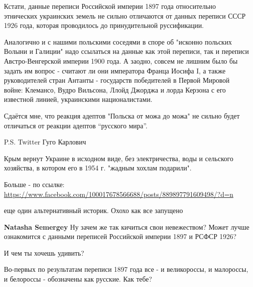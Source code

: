 \begin{itemize}
Кстати, данные переписи Российской империи 1897 года относительно этнических
украинских земель не сильно отличаются от данных переписи СССР 1926 года,
которая проводилось до принудительной руссификации.

Аналогично и с нашими польскими соседями в споре об "исконно польских Волыни и
Галиции" надо ссылаться на данные как этой переписи, так и переписи
Австро-Венгерской империи 1900 года. А заодно, совсем не лишним было бы задать
им вопрос - считают ли они императора Франца Иосифа I, а также руководителей
стран Антанты - государств победителей в Первой Мировой войне: Клемансо, Вудро
Вильсона, Ллойд Джорджа и лорда Керзона с его известной линией, украинскими
националистами.

Сдаётся мне, что реакция адептов "Польска от можа до можа" не сильно будет
отличаться от реакции адептов “русского мира”.

P.S. Twitter Гуго Карлович

Крым вернут Украине в исходном виде, без электричества, воды и сельского
хозяйства, в котором его в 1954 г. "жадным хохлам подарили".

Больше - по ссылке: \url{https://www.facebook.com/100017678566688/posts/889897791609498/?d=n}

\begin{itemize}
 
еще один альтернативный историк. Охохо как все запущено

 
\textbf{Natasha Semergey} Ну зачем же так кичиться свои невежеством? Может лучше ознакомится с данными переписей Российской империи 1897 и РСФСР 1926?

 
И чем ты хочешь удивить?

Во-первых по результатам переписи 1897 года все - и великороссы, и малороссы, и
белороссы - обозначены как русские. Как тебе?


\end{itemize}
\end{itemize}
